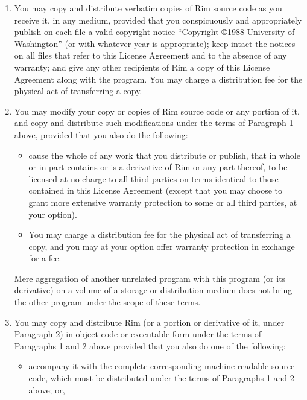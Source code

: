 \begin{enumerate}
\item
You may copy and distribute verbatim copies of Rim source code as you
receive it, in any medium, provided that you conspicuously and
appropriately publish on each file a valid copyright notice ``Copyright
\copyright 1988 University of Washington'' (or with whatever year
is appropriate); keep intact the notices on all files that
refer to this License Agreement and to the absence of any warranty; and
give any other recipients of Rim a copy of this License
Agreement along with the program.  You may charge a distribution fee
for the physical act of transferring a copy.
 
\item
You may modify your copy or copies of Rim source code or
any portion of it, and copy and distribute such modifications under
the terms of Paragraph 1 above, provided that you also do the following:
 
\begin{itemize}
\item
cause the whole of any work that you distribute or publish, that
in whole or in part contains or is a derivative of Rim or any
part thereof, to be licensed at no charge to all third parties on
terms identical to those contained in this License Agreement
(except that you may choose to grant more extensive warranty
protection to some or all third parties, at your option).
 
\item
You may charge a distribution fee for the physical act of
transferring a copy, and you may at your option offer warranty
protection in exchange for a fee.
\end{itemize}
 
Mere aggregation of another unrelated program with this program (or its
derivative) on a volume of a storage or distribution medium does not bring
the other program under the scope of these terms.
 
\item
You may copy and distribute Rim (or a portion or derivative of it,
under Paragraph 2) in object code or executable form under the terms
of Paragraphs 1 and 2 above provided that you also do one of the
following:
 
\begin{itemize}
\item
accompany it with the complete corresponding machine-readable
source code, which must be distributed under the terms of
Paragraphs 1 and 2 above; or,
 

\end{itemize}
\end{enumerate}

